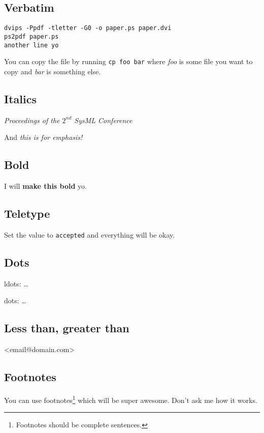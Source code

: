 \documentclass{article}
\begin{document}
\subsection{Verbatim}

{\footnotesize
\begin{verbatim}
dvips -Ppdf -tletter -G0 -o paper.ps paper.dvi
ps2pdf paper.ps
another line yo
\end{verbatim}}

You can copy the file by running \verb|cp foo bar| where \textit{foo}
is some file you want to copy and \textit{bar} is something else.

\subsection{Italics}

\textit{Proceedings of the $\mathit{2}^{nd}$ SysML Conference}

And \emph{this is for emphasis!}

\subsection{Bold}

I will \textbf{make this bold} yo.

\subsection{Teletype}

Set the value to \texttt{accepted} and everything will be okay.

\subsection{Dots}

ldots: \ldots

dots: \dots

\subsection{Less than, greater than}

\textless{}email@domain.com\textgreater{}

\subsection{Footnotes}

You can use footnotes\footnote{Footnotes should be complete
  sentences.} which will be super awesome. Don't ask me how it works.
\end{document}
